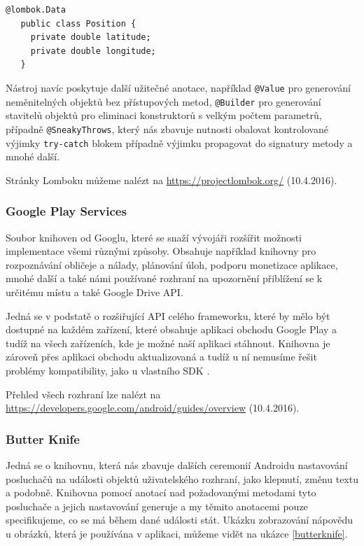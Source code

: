 \documentclass[czech,master,public,dept460,male,java,cpdeclaration]{diploma}
\begin{document}
\begin{lstlisting}[label=lombokshowcase,caption=Datová třída používající Lombok]
   @lombok.Data
   public class Position {
     private double latitude;
     private double longitude;
   }
\end{lstlisting}

Nástroj navíc poskytuje další užitečné anotace, například \texttt{@Value} pro generování neměnitelných objektů
bez přístupových metod, \texttt{@Builder} pro generování stavitelů objektů pro eliminaci konstruktorů s velkým
počtem parametrů, případně \texttt{@SneakyThrows}, který nás zbavuje nutnosti obalovat kontrolované výjimky
\texttt{try-catch} blokem případně výjimku propagovat do signatury metody a mnohé další.

Stránky Lomboku můžeme nalézt na \url{https://projectlombok.org/}  (10.4.2016).

\subsubsection{Google Play Services}
Soubor knihoven od Googlu, které se snaží vývojáři rozšířit možnosti implementace všemi různými způsoby.
Obsahuje například knihovny pro rozpoznávání obličeje a nálady, plánování úloh, podporu monetizace aplikace,
mnohé další a také námi používané rozhraní na upozornění přiblížení se k určitému místu a také Google Drive API.

Jedná se v podstatě o rozšiřující API celého frameworku, které by mělo být dostupné na každém zařízení, které
obsahuje aplikaci obchodu Google Play a tudíž na všech zařízeních, kde je možné naší aplikaci stáhnout.
Knihovna je zároveň přes aplikaci obchodu aktualizovaná a tudíž u ní nemusíme řešit problémy
kompatibility, jako u vlastního SDK \cite{gms}.

Přehled všech rozhraní lze nalézt na \url{https://developers.google.com/android/guides/overview}  (10.4.2016).

\subsubsection{Butter Knife}
Jedná se o knihovnu, která nás zbavuje dalších ceremonií Androidu nastavování posluchačů
na události objektů uživatelského rozhraní, jako klepnutí, změnu textu a podobně. Knihovna pomocí
anotací nad požadovanými metodami tyto posluchače a jejich nastavování generuje a my těmito anotacemi
pouze specifikujeme, co se má během dané události stát. Ukázku zobrazování nápovědu u obrázků, která je
používána v aplikaci, můžeme vidět na ukázce \ref{butterknife}.
\end{document}
